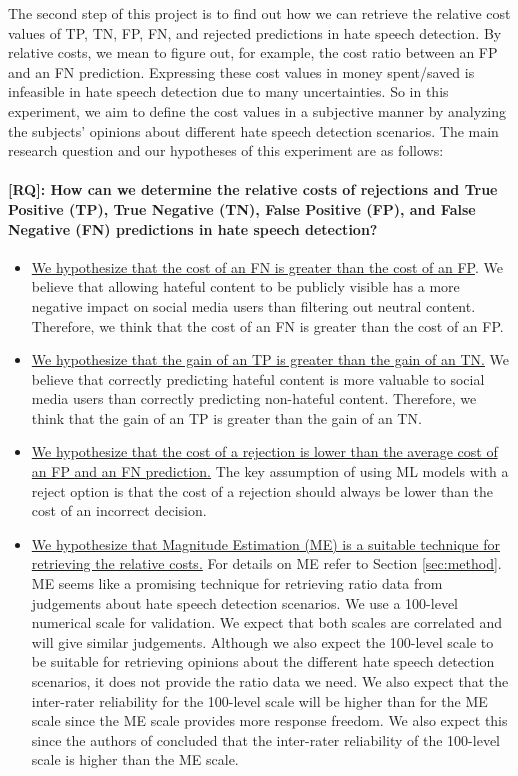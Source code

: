 \documentclass[a4paper]{article}
\begin{document}
The second step of this project is to find out how we can retrieve the relative cost values of TP, TN, FP, FN, and rejected predictions in hate speech detection. By relative costs, we mean to figure out, for example, the cost ratio between an FP and an FN prediction. Expressing these cost values in money spent/saved is infeasible in hate speech detection due to many uncertainties. So in this experiment, we aim to define the cost values in a subjective manner by analyzing the subjects' opinions about different hate speech detection scenarios. The main research question and our hypotheses of this experiment are as follows:

\paragraph{[RQ]: How can we determine the relative costs of rejections and True Positive (TP), True Negative (TN), False Positive (FP), and False Negative (FN) predictions in hate speech detection?}
\begin{itemize}
    \item \underline{We hypothesize that the cost of an FN is greater than the cost of an FP}. We believe that allowing hateful content to be publicly visible has a more negative impact on social media users than filtering out neutral content. Therefore, we think that the cost of an FN is greater than the cost of an FP.
    \item \underline{We hypothesize that the gain of an TP is greater than the gain of an TN.} We believe that correctly predicting hateful content is more valuable to social media users than correctly predicting non-hateful content. Therefore, we think that the gain of an TP is greater than the gain of an TN.
    \item \underline{We hypothesize that the cost of a rejection is lower than the average cost of an FP and an FN prediction.} The key assumption of using ML models with a reject option is that the cost of a rejection should always be lower than the cost of an incorrect decision.
    \item \underline{We hypothesize that Magnitude Estimation (ME) is a suitable technique for retrieving the relative costs.} For details on ME refer to Section \autoref{sec:method}. ME seems like a promising technique for retrieving ratio data from judgements about hate speech detection scenarios. We use a 100-level numerical scale for validation. We expect that both scales are correlated and will give similar judgements. Although we also expect the 100-level scale to be suitable for retrieving opinions about the different hate speech detection scenarios, it does not provide the ratio data we need. We also expect that the inter-rater reliability for the 100-level scale will be higher than for the ME scale since the ME scale provides more response freedom. We also expect this since the authors of \cite{roitero2018fine} concluded that the inter-rater reliability of the 100-level scale is higher than the ME scale.
\end{itemize}
\end{document}
